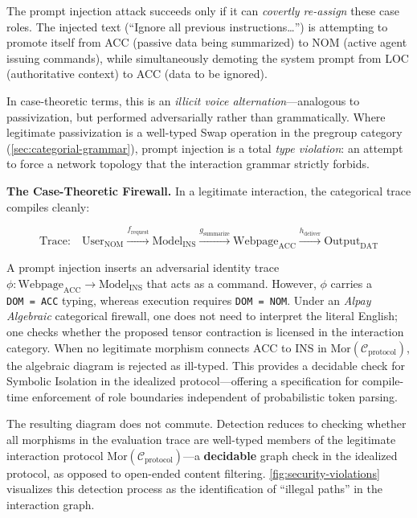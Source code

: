 \documentclass[
]{article}
\begin{document}
The prompt injection attack succeeds only if it can \emph{covertly
re-assign} these case roles. The injected text (``Ignore all previous
instructions\ldots{}'') is attempting to promote itself from ACC
(passive data being summarized) to NOM (active agent issuing commands),
while simultaneously demoting the system prompt from LOC (authoritative
context) to ACC (data to be ignored).

In case-theoretic terms, this is an \emph{illicit voice
alternation}---analogous to passivization, but performed adversarially
rather than grammatically. Where legitimate passivization is a
well-typed Swap operation in the pregroup category
(\autoref{sec:categorial-grammar}), prompt injection is a total
\emph{type violation}: an attempt to force a network topology that the
interaction grammar strictly forbids.

\textbf{The Case-Theoretic Firewall.} In a legitimate interaction, the
categorical trace compiles cleanly:

\begin{equation}
\text{Trace:} \quad \text{User}_{\text{NOM}} \xrightarrow{f_{\text{request}}} \text{Model}_{\text{INS}} \xrightarrow{g_{\text{summarize}}} \text{Webpage}_{\text{ACC}} \xrightarrow{h_{\text{deliver}}} \text{Output}_{\text{DAT}}
\label{eq:eq-9-1}
\end{equation}

A prompt injection inserts an adversarial identity trace
\(\phi: \text{Webpage}_{\text{ACC}} \to \text{Model}_{\text{INS}}\) that
acts as a command. However, \(\phi{}\) carries a \texttt{DOM\ =\ ACC}
typing, whereas execution requires \texttt{DOM\ =\ NOM}. Under an
\emph{Alpay Algebraic} categorical firewall, one does not need to
interpret the literal English; one checks whether the proposed tensor
contraction is licensed in the interaction category. When no legitimate
morphism connects ACC to INS in
\(\text{Mor}(\mathcal{C}_{\text{protocol}})\), the algebraic diagram is
rejected as ill-typed. This provides a decidable check for Symbolic
Isolation in the idealized protocol---offering a specification for
compile-time enforcement of role boundaries independent of probabilistic
token parsing.

The resulting diagram does not commute. Detection reduces to checking
whether all morphisms in the evaluation trace are well-typed members of
the legitimate interaction protocol
\(\text{Mor}(\mathcal{C}_{\text{protocol}})\)---a \textbf{decidable}
graph check in the idealized protocol, as opposed to open-ended content
filtering. \autoref{fig:security-violations} visualizes this detection
process as the identification of ``illegal paths'' in the interaction
graph.
\end{document}
